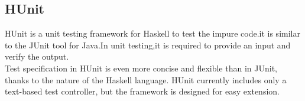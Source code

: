 \subsection*{HUnit}
HUnit is a unit testing framework for Haskell to test the impure code.it is similar to the JUnit tool for Java.In unit testing,it is required to provide an input and verify the output.\\
 Test specification in HUnit is even more concise and flexible than in JUnit, thanks to the nature of the Haskell language.  HUnit currently includes only a text-based test controller, but the framework is designed for easy extension. \cite{hunit}




